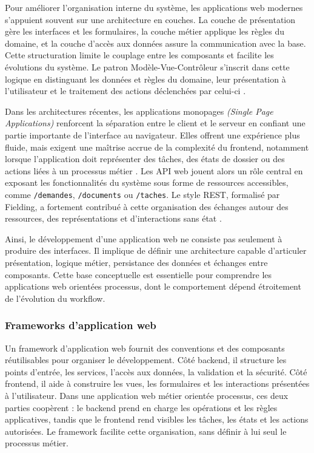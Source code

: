 Pour améliorer l’organisation interne du système, les applications web modernes
s’appuient souvent sur une architecture en couches. La couche de présentation
gère les interfaces et les formulaires, la couche métier applique les règles du
domaine, et la couche d’accès aux données assure la communication avec la base.
Cette structuration limite le couplage entre les composants et facilite les
évolutions du système. Le patron Modèle-Vue-Contrôleur s’inscrit dans cette
logique en distinguant les données et règles du domaine, leur présentation à
l’utilisateur et le traitement des actions déclenchées par celui-ci
\cite{leff2001web}.

Dans les architectures récentes, les applications monopages
\textit{(Single Page Applications)} renforcent la séparation entre le client et
le serveur en confiant une partie importante de l’interface au navigateur. Elles
offrent une expérience plus fluide, mais exigent une maîtrise accrue de la
complexité du frontend, notamment lorsque l’application doit représenter des
tâches, des états de dossier ou des actions liées à un processus métier
\cite{mdn2026spa}. Les API web jouent alors un rôle central en exposant les
fonctionnalités du système sous forme de ressources accessibles, comme
\texttt{/demandes}, \texttt{/documents} ou \texttt{/taches}. Le style REST,
formalisé par Fielding, a fortement contribué à cette organisation des échanges
autour des ressources, des représentations et d’interactions sans état
\cite{fielding2000architectural}.

Ainsi, le développement d’une application web ne consiste pas seulement à produire
des interfaces. Il implique de définir une architecture capable d’articuler
présentation, logique métier, persistance des données et échanges entre
composants. Cette base conceptuelle est essentielle pour comprendre les
applications web orientées processus, dont le comportement dépend étroitement de
l’évolution du workflow.

\subsubsection{Frameworks d'application web}

Un framework d'application web fournit des conventions et des composants
réutilisables pour organiser le développement. Côté backend, il structure les
points d'entrée, les services, l'accès aux données, la validation et la sécurité.
Côté frontend, il aide à construire les vues, les formulaires et les interactions
présentées à l'utilisateur. Dans une application web métier orientée processus,
ces deux parties coopèrent : le backend prend en charge les opérations et les
règles applicatives, tandis que le frontend rend visibles les tâches, les états
et les actions autorisées. Le framework facilite cette organisation, sans définir
à lui seul le processus métier.

